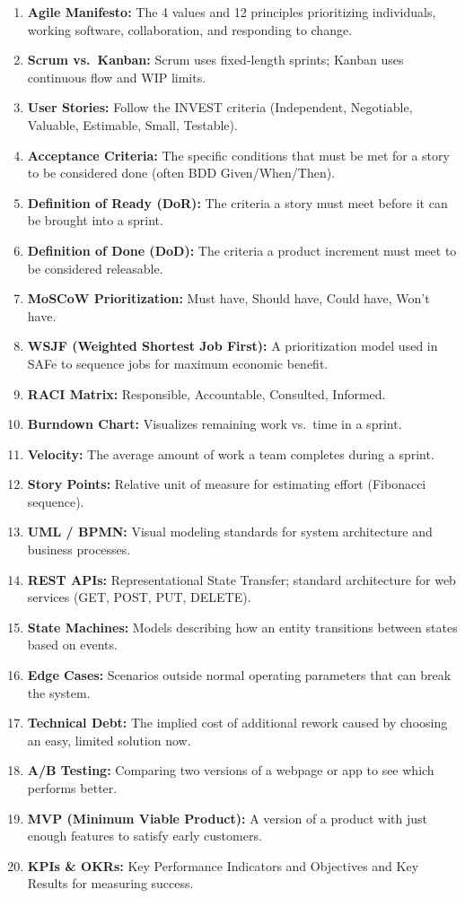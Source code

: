\documentclass[
  11pt,
  openany,
  oneside]{book}
\providecommand{\tightlist}{%
  \setlength{\itemsep}{0pt}\setlength{\parskip}{0pt}}
\begin{document}
\begin{enumerate}
\def\labelenumi{\arabic{enumi}.}
\tightlist
\item
  \textbf{Agile Manifesto:} The 4 values and 12 principles prioritizing
  individuals, working software, collaboration, and responding to
  change.
\item
  \textbf{Scrum vs.~Kanban:} Scrum uses fixed-length sprints; Kanban
  uses continuous flow and WIP limits.
\item
  \textbf{User Stories:} Follow the INVEST criteria (Independent,
  Negotiable, Valuable, Estimable, Small, Testable).
\item
  \textbf{Acceptance Criteria:} The specific conditions that must be met
  for a story to be considered done (often BDD Given/When/Then).
\item
  \textbf{Definition of Ready (DoR):} The criteria a story must meet
  before it can be brought into a sprint.
\item
  \textbf{Definition of Done (DoD):} The criteria a product increment
  must meet to be considered releasable.
\item
  \textbf{MoSCoW Prioritization:} Must have, Should have, Could have,
  Won't have.
\item
  \textbf{WSJF (Weighted Shortest Job First):} A prioritization model
  used in SAFe to sequence jobs for maximum economic benefit.
\item
  \textbf{RACI Matrix:} Responsible, Accountable, Consulted, Informed.
\item
  \textbf{Burndown Chart:} Visualizes remaining work vs.~time in a
  sprint.
\item
  \textbf{Velocity:} The average amount of work a team completes during
  a sprint.
\item
  \textbf{Story Points:} Relative unit of measure for estimating effort
  (Fibonacci sequence).
\item
  \textbf{UML / BPMN:} Visual modeling standards for system architecture
  and business processes.
\item
  \textbf{REST APIs:} Representational State Transfer; standard
  architecture for web services (GET, POST, PUT, DELETE).
\item
  \textbf{State Machines:} Models describing how an entity transitions
  between states based on events.
\item
  \textbf{Edge Cases:} Scenarios outside normal operating parameters
  that can break the system.
\item
  \textbf{Technical Debt:} The implied cost of additional rework caused
  by choosing an easy, limited solution now.
\item
  \textbf{A/B Testing:} Comparing two versions of a webpage or app to
  see which performs better.
\item
  \textbf{MVP (Minimum Viable Product):} A version of a product with
  just enough features to satisfy early customers.
\item
  \textbf{KPIs \& OKRs:} Key Performance Indicators and Objectives and
  Key Results for measuring success.
\end{enumerate}
\end{document}
